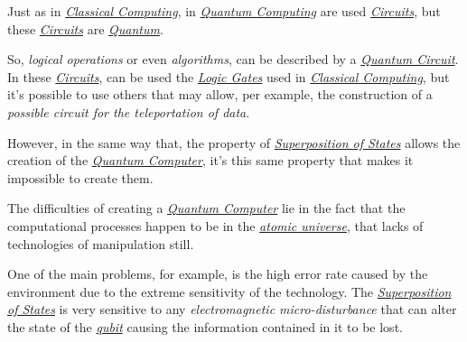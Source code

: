 \documentclass[conference]{IEEEtran}
\begin{document}
\newpage

Just as in \href{https://en.wikipedia.org/wiki/Von_Neumann_architecture}{\textit{Classical Computing}}, in \href{https://en.wikipedia.org/wiki/Quantum_computing}{\textit{Quantum Computing}} are used \href{https://en.wikipedia.org/wiki/Circuit}{\textit{Circuits}}, but these \href{https://en.wikipedia.org/wiki/Circuit}{\textit{Circuits}} are \href{https://en.wikipedia.org/wiki/Quantum}{\textit{Quantum}}.

\vspace{4pt}

So, \textit{logical operations} or even \textit{algorithms}, can be described by a \href{https://en.wikipedia.org/wiki/Quantum_circuit}{\textit{Quantum Circuit}}. In these \href{https://en.wikipedia.org/wiki/Circuit}{\textit{Circuits}}, can be used the \href{https://en.wikipedia.org/wiki/Logic_gate}{\textit{Logic Gates}} used in \href{https://en.wikipedia.org/wiki/Von_Neumann_architecture}{\textit{Classical Computing}}, but it's possible to use others that may allow, per example, the construction of a \textit{possible circuit for the teleportation of data}.

\vspace{4pt}

However, in the same way that, the property of \href{https://en.wikipedia.org/wiki/Quantum_superposition}{\textit{Superposition of States}} allows the creation of the \href{https://en.wikipedia.org/wiki/Quantum_computing}{\textit{Quantum Computer}}, it's this same property that makes it impossible to create them.

\vspace{4pt}

The difficulties of creating a \href{https://en.wikipedia.org/wiki/Quantum_computing}{\textit{Quantum Computer}} lie in the fact that the computational processes happen to be in the \href{https://en.wikipedia.org/wiki/Atom}{\textit{atomic universe}}, that lacks of technologies of manipulation still.

\vspace{4pt}

One of the main problems, for example, is the high error rate caused by the environment due to the extreme sensitivity of the technology. The \href{https://en.wikipedia.org/wiki/Quantum_superposition}{\textit{Superposition of States}} is very sensitive to any \textit{electromagnetic micro-disturbance} that can alter the state of the \href{https://en.wikipedia.org/wiki/Qubit}{\textit{qubit}} causing the information contained in it to be lost.
\end{document}
